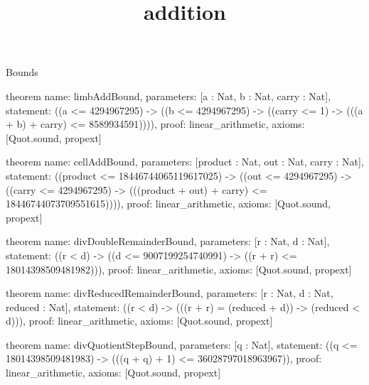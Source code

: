 \begin{lexlean}{Bounds}
\title{addition}
\begin{semanticmodule}
theorem{
  name: limbAddBound,
  parameters: [a : Nat, b : Nat, carry : Nat],
  statement: ((a <= 4294967295) -> ((b <= 4294967295) -> ((carry <= 1) -> (((a + b) + carry) <= 8589934591)))),
  proof: linear_arithmetic{},
  axioms: [Quot.sound, propext]
}

theorem{
  name: cellAddBound,
  parameters: [product : Nat, out : Nat, carry : Nat],
  statement: ((product <= 18446744065119617025) -> ((out <= 4294967295) -> ((carry <= 4294967295) -> (((product + out) + carry) <= 18446744073709551615)))),
  proof: linear_arithmetic{},
  axioms: [Quot.sound, propext]
}

theorem{
  name: divDoubleRemainderBound,
  parameters: [r : Nat, d : Nat],
  statement: ((r < d) -> ((d <= 9007199254740991) -> ((r + r) <= 18014398509481982))),
  proof: linear_arithmetic{},
  axioms: [Quot.sound, propext]
}

theorem{
  name: divReducedRemainderBound,
  parameters: [r : Nat, d : Nat, reduced : Nat],
  statement: ((r < d) -> (((r + r) = (reduced + d)) -> (reduced < d))),
  proof: linear_arithmetic{},
  axioms: [Quot.sound, propext]
}

theorem{
  name: divQuotientStepBound,
  parameters: [q : Nat],
  statement: ((q <= 18014398509481983) -> (((q + q) + 1) <= 36028797018963967)),
  proof: linear_arithmetic{},
  axioms: [Quot.sound, propext]
}
\end{semanticmodule}
\end{lexlean}
